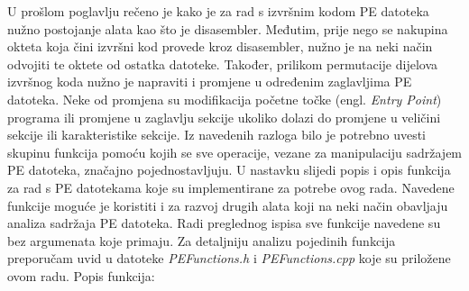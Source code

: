 \documentclass[times, utf8, diplomski, numeric]{fer}
\begin{document}
U prošlom poglavlju rečeno je kako je za rad s izvršnim kodom PE
datoteka nužno postojanje alata kao što je disasembler. Međutim,
prije nego se nakupina okteta koja čini izvršni kod provede kroz
disasembler, nužno je na neki način odvojiti te oktete od ostatka
datoteke. Također, prilikom permutacije dijelova izvršnog koda
nužno je napraviti i promjene u određenim zaglavljima PE
datoteka. Neke od promjena su modifikacija početne točke (engl. 
\emph{Entry Point}) programa ili promjene u zaglavlju sekcije
ukoliko dolazi do promjene u veličini sekcije ili karakteristike
sekcije. Iz navedenih razloga bilo je potrebno uvesti skupinu
funkcija pomoću kojih se sve operacije, vezane za manipulaciju
sadržajem PE datoteka, značajno pojednostavljuju. U nastavku
slijedi popis i opis funkcija za rad s PE datotekama koje su
implementirane za potrebe ovog rada. Navedene funkcije moguće je
koristiti i za razvoj drugih alata koji na neki način obavljaju
analiza sadržaja PE datoteka. Radi preglednog ispisa sve funkcije
navedene su bez argumenata koje primaju. Za detaljniju analizu
pojedinih funkcija preporučam uvid u datoteke
\emph{PEFunctions.h} i \emph{PEFunctions.cpp} koje su priložene
ovom radu. Popis funkcija:
\end{document}
